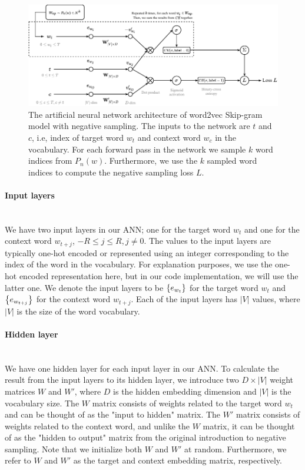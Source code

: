 \begin{figure}[ht]
    \centering
    \includegraphics[width=16cm]{thesis/figures/word2vec-sgns_cropped.pdf}
    \caption{The artificial neural network architecture of word2vec Skip-gram model with negative sampling. The inputs to the network are $t$ and $c$, i.e, index of target word $w_t$ and context word $w_c$ in the vocabulary. For each forward pass in the network we sample $k$ word indices from $P_n(w)$. Furthermore, we use the $k$ sampled word indices to compute the negative sampling loss $L$.}
    \label{fig:word2vec-skip-gram-negative-sampling}
\end{figure}

\paragraph*{Input layers}\mbox{} \\
We have two input layers in our ANN; one for the target word $w_t$ and one for the context word $w_{t+j}$, $-R \leq j \leq R, j \neq 0$. The values to the input layers are typically one-hot encoded or represented using an integer corresponding to the index of the word in the vocabulary. For explanation purposes, we use the one-hot encoded representation here, but in our code implementation, we will use the latter one. We denote the input layers to be $\left\{e_{w_t}\right\}$ for the target word $w_t$ and $\left\{e_{w_{t+j}}\right\}$ for the context word $w_{t+j}$. Each of the input layers has $|V|$ values, where $|V|$ is the size of the word vocabulary.

\paragraph*{Hidden layer}\mbox{} \\
We have one hidden layer for each input layer in our ANN. To calculate the result from the input layers to its hidden layer, we introduce two $D \times |V|$ weight matrices $W$ and $W'$, where $D$ is the hidden embedding dimension and $|V|$ is the vocabulary size. The $W$ matrix consists of weights related to the target word $w_t$ and can be thought of as the "input to hidden" matrix. The $W'$ matrix consists of weights related to the context word, and unlike the $W$ matrix, it can be thought of as the "hidden to output" matrix from the original introduction to negative sampling. Note that we initialize both $W$ and $W'$ at random. Furthermore, we refer to $W$ and $W'$ as the target and context embedding matrix, respectively.

